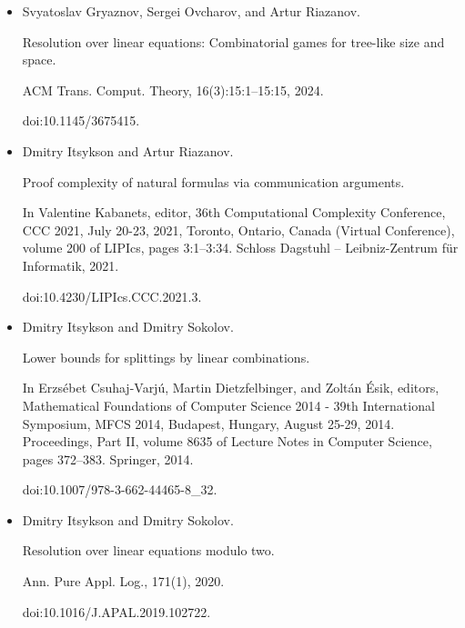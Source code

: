 \documentclass[10pt,a4paper]{article}
\begin{document}
\begin{itemize}
doi:10.1145/3717823.3718229.





\item 
[22]

Svyatoslav Gryaznov, Sergei Ovcharov, and Artur Riazanov.


Resolution over linear equations: Combinatorial games for tree-like
size and space.


ACM Trans. Comput. Theory, 16(3):15:1–15:15, 2024.


doi:10.1145/3675415.





\item 
[23]

Dmitry Itsykson and Artur Riazanov.


Proof complexity of natural formulas via communication arguments.


In Valentine Kabanets, editor, 36th Computational Complexity
Conference, CCC 2021, July 20-23, 2021, Toronto, Ontario, Canada (Virtual
Conference), volume 200 of LIPIcs, pages 3:1–3:34. Schloss Dagstuhl
– Leibniz-Zentrum für Informatik, 2021.


doi:10.4230/LIPIcs.CCC.2021.3.





\item 
[24]

Dmitry Itsykson and Dmitry Sokolov.


Lower bounds for splittings by linear combinations.


In Erzsébet Csuhaj-Varjú, Martin Dietzfelbinger, and
Zoltán Ésik, editors, Mathematical Foundations of Computer
Science 2014 - 39th International Symposium, MFCS 2014, Budapest, Hungary,
August 25-29, 2014. Proceedings, Part II, volume 8635 of Lecture
Notes in Computer Science, pages 372–383. Springer, 2014.


doi:10.1007/978-3-662-44465-8\_32.





\item 
[25]

Dmitry Itsykson and Dmitry Sokolov.


Resolution over linear equations modulo two.


Ann. Pure Appl. Log., 171(1), 2020.


doi:10.1016/J.APAL.2019.102722.






\end{itemize}
\end{document}
